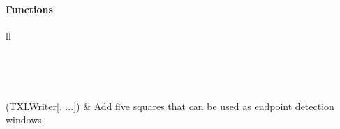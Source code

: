 \documentclass[letterpaper,10pt,english]{sphinxmanual}
\begin{document}
\paragraph{Functions}
\label{Chapters/PythonModuleReference/ShapeLibrary/TXLWizard.ShapeLibrary.EndpointDetectionWindows:functions}
\begin{longtable}{ll}
\hline
\endfirsthead

%
{{}} \\
\hline
\endhead

\hline {} \\ \hline
\endfoot

\endlastfoot


{\hyperref[Chapters/PythonModuleReference/ShapeLibrary/TXLWizard.ShapeLibrary.EndpointDetectionWindows:TXLWizard.ShapeLibrary.EndpointDetectionWindows.GetEndpointDetectionWindows]{}}(TXLWriter{[}, ...{]})
 & 
Add five squares that can be used as endpoint detection windows.
\\
\hline\end{longtable}

\end{document}
